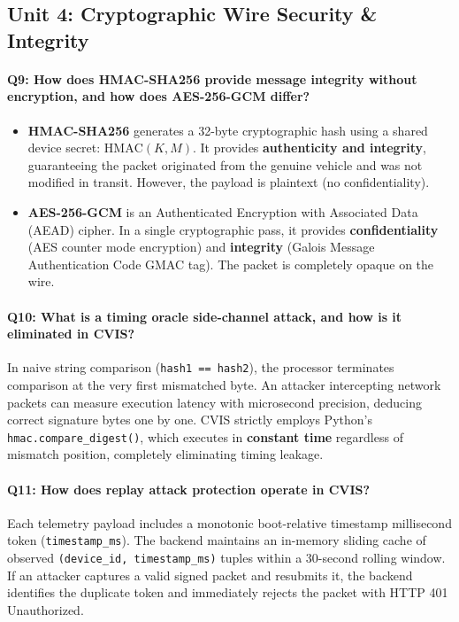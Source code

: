 \documentclass[12pt,a4paper]{report}
\begin{document}
\subsection{Unit 4: Cryptographic Wire Security \& Integrity}

\paragraph{Q9: How does HMAC-SHA256 provide message integrity without encryption, and how does AES-256-GCM differ?}
\begin{itemize}[leftmargin=*,nosep]
  \item \textbf{HMAC-SHA256} generates a 32-byte cryptographic hash using a shared device secret: $\text{HMAC}(K, M)$. It provides \textbf{authenticity and integrity}, guaranteeing the packet originated from the genuine vehicle and was not modified in transit. However, the payload is plaintext (no confidentiality).
  \item \textbf{AES-256-GCM} is an Authenticated Encryption with Associated Data (AEAD) cipher. In a single cryptographic pass, it provides \textbf{confidentiality} (AES counter mode encryption) and \textbf{integrity} (Galois Message Authentication Code GMAC tag). The packet is completely opaque on the wire.
\end{itemize}

\paragraph{Q10: What is a timing oracle side-channel attack, and how is it eliminated in CVIS?}
In naive string comparison (\texttt{hash1 == hash2}), the processor terminates comparison at the very first mismatched byte. An attacker intercepting network packets can measure execution latency with microsecond precision, deducing correct signature bytes one by one. CVIS strictly employs Python's \texttt{hmac.compare\_digest()}, which executes in \textbf{constant time} regardless of mismatch position, completely eliminating timing leakage.

\paragraph{Q11: How does replay attack protection operate in CVIS?}
Each telemetry payload includes a monotonic boot-relative timestamp millisecond token (\texttt{timestamp\_ms}). The backend maintains an in-memory sliding cache of observed \texttt{(device\_id, timestamp\_ms)} tuples within a 30-second rolling window. If an attacker captures a valid signed packet and resubmits it, the backend identifies the duplicate token and immediately rejects the packet with HTTP 401 Unauthorized.
\end{document}
